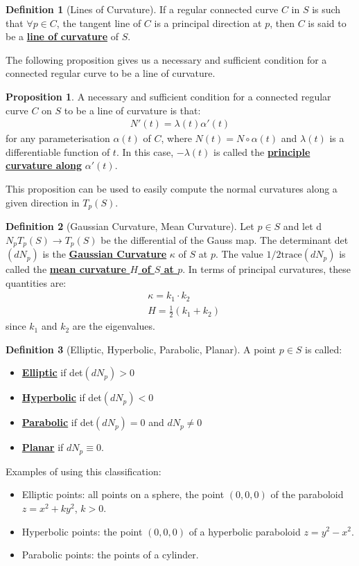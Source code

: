 \documentclass[11pt]{scrartcl}
\theoremstyle{definition}
\newtheorem{definition}{Definition}
\newtheorem{prop}{Proposition}
\theoremstyle{remark}
\newcommand{\dfn}[1]{\textbf{\underline{#1}}}
\begin{document}
{\begin{definition}[Lines of Curvature]
	If a regular connected curve $C$ in $S$ is such that $\forall p \in C$, the tangent line of $C$ is a principal direction at $p$, then $C$ is said to be a \dfn{line of curvature} of $S$. 
\end{definition}

The following proposition gives us a necessary and sufficient condition for a connected regular curve to be a line of curvature. 

\begin{prop}
	A necessary and sufficient condition for a connected regular curve $C$ on $S$ to be a line of curvature is that: 
	\begin{align*}
		N'(t) = \lambda(t) \alpha'(t)
	\end{align*}
	for any parameterisation $\alpha(t)$ of $C$, where $N(t) = N \circ \alpha(t)$ and $\lambda(t)$ is a differentiable function of $t$. In this case, $-\lambda(t)$ is called the \dfn{principle curvature along} $\alpha'(t)$. 
\end{prop}

This proposition can be used to easily compute the normal curvatures along a given direction in $T_p(S)$. 

\begin{definition}[Gaussian Curvature, Mean Curvature]
	Let $p \in S$ and let d$N_p T_p(S) \rightarrow T_p(S)$ be the differential of the Gauss map. The determinant det$(dN_p)$ is the \dfn{Gaussian Curvature} $\kappa$ of $S$ at $p$. The value $ 1/2 \text{trace}(dN_p)$ is called the \dfn{mean curvature $H$ of $S$ at $p$}. In terms of principal curvatures, these quantities are: 
	\begin{align*}
		& \kappa = k_1 \cdot k_2 \\
		& H = \frac{1}{2} ( k_1 + k_2) 
	\end{align*}
	since $k_1$ and $k_2$ are the eigenvalues. 
\end{definition}

\begin{definition}[Elliptic, Hyperbolic, Parabolic, Planar]
	A point $p \in S$ is called: 
	\begin{itemize}[noitemsep]
		\item \dfn{Elliptic} if det$(dN_p) > 0$ 
		\item \dfn{Hyperbolic} if det$(dN_p) < 0$ 
		\item \dfn{Parabolic} if det$(dN_p) = 0$ and $dN_p \neq 0$
		\item \dfn{Planar} if $dN_p \equiv 0$. 
	\end{itemize}
\end{definition}
Examples of using this classification: 
\begin{itemize}[noitemsep]
	\item Elliptic points: all points on a sphere, the point $(0,0,0)$ of the paraboloid $z = x^2 + ky^2$, $k  > 0$. 
	\item Hyperbolic points: the point $(0,0,0)$ of a hyperbolic paraboloid $z = y^2 - x^2$. 
	\item Parabolic points: the points of a cylinder. 
\end{itemize}

}
\end{document}
